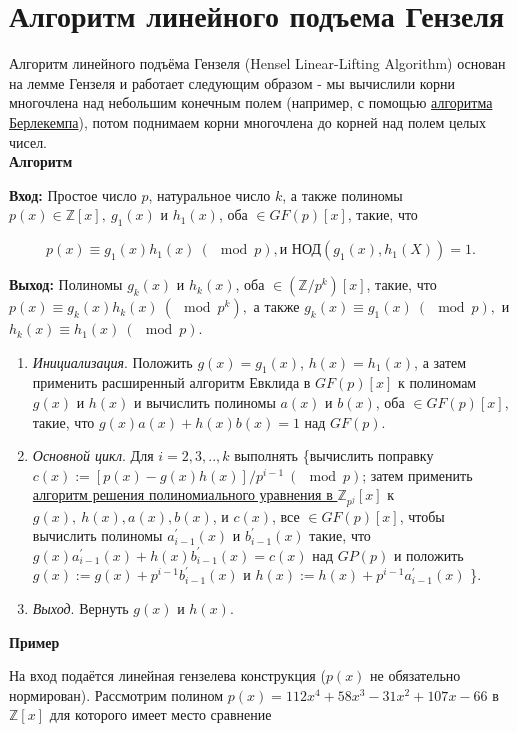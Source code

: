 \documentclass[12pt,a4paper]{scrartcl}
\begin{document}
	
\section{Алгоритм линейного подъема Гензеля}

Алгоритм линейного подъёма Гензеля (Hensel Linear-Lifting Algorithm) основан на лемме Гензеля и работает следующим образом - мы вычислили корни многочлена над небольшим конечным полем (например, с помощью \href{https://yatb.kksctf.ru/}{алгоритма Берлекемпа}), потом поднимаем корни многочлена до корней над полем целых чисел.\\

\textbf{Алгоритм}

\textbf{Вход:} Простое число $p$, натуральное число $k$, а также полиномы $p(x) \in \mathbb{Z}[x],\ g_1(x)$ и $h_1(x)$, оба $\in GF(p)[x]$, такие, что

$$p(x) \equiv g_1(x)h_1(x)\ (\mod p), \text{и НОД} (g_1(x),h_1(X))=1.$$

\textbf{Выход:} Полиномы $g_k(x)$ и $h_k(x)$, оба $\in (\mathbb{Z}/p^k)[x]$, такие, что $p(x) \equiv g_k(x)h_k(x)\ (\mod p^k),$ а также $g_k(x) \equiv g_1(x)\ (\mod p),$ и $h_k(x) \equiv h_1(x)\ (\mod p)$.

\begin{enumerate}
	\item \textit{Инициализация}. Положить $g(x) = g_1(x)$, $h(x) = h_1(x)$, а затем применить расширенный алгоритм Евклида в $GF(p)[x]$ к полиномам $g(x)$ и $h(x)$ и вычислить полиномы $a(x)$ и $b(x)$, оба $\in GF(p)[x]$, такие, что $g(x)a(x)+h(x)b(x)=1$ над $GF(p)$.
	
	\item \textit{Основной цикл}. Для $i=2,3,..,k$ выполнять \{вычислить поправку $c(x) := [p(x)-g(x)h(x)]/p^{i-1}\ (\mod p)$; затем применить \href{https://yatb.kksctf.ru/}{алгоритм решения полиномиального уравнения в $\mathbb{Z}_{p^j}[x]$} к $g(x),\ h(x), a(x), b(x)$, и $c(x)$, все $\in GF(p)[x]$, чтобы вычислить полиномы $a_{i-1}^{'}(x)$ и $b_{i-1}^{'}(x)$ такие, что $g(x)a_{i-1}^{'}(x)+h(x)b_{i-1}^{'}(x)=c(x)$ над $GP(p)$ и положить $g(x) := g(x) + p^{i-1}b_{i-1}^{'}(x)$  и $h(x) :=h(x) + p^{i-1}a_{i-1}^{'}(x)$ \}.
	
	\item \textit{Выход}. Вернуть $g(x)$ и $h(x)$.
\end{enumerate}

\textbf{Пример}

На вход подаётся линейная гензелева конструкция ($p(x)$ не обязательно нормирован). Рассмотрим полином $p(x)=112x^4+58x^3-31x^2+107x-66$ в $\mathbb{Z}[x]$ для которого имеет место сравнение
\end{document}
